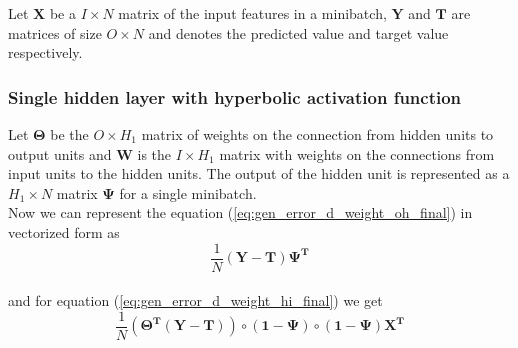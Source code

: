 Let $\mathbf{X}$ be a $I \times N$ matrix of the input features in a minibatch, $\mathbf{Y}$ and $\mathbf{T}$ are matrices of size $O \times N$ and denotes the predicted value and target value respectively. 

\subsubsection{Single hidden layer with hyperbolic activation function} \label{ch:mtx_single_hidden_layer}
 Let $\mathbf{\Theta}$ be the $O \times H_{1}$ matrix of weights on the connection from hidden units to output units and $\mathbf{W}$ is the $I \times H_{1}$ matrix with weights on the connections from input units to the hidden units. The output of the hidden unit is represented as a $H_{1} \times N$ matrix $\mathbf{\Psi}$ for a single minibatch.  
 \\
 Now we can represent the equation (\ref{eq:gen_error_d_weight_oh_final}) in vectorized form as
\begin{displaymath}
 \frac{1}{N}(\mathbf{Y}-\mathbf{T}) \mathbf{\Psi^{T}} 
 \end{displaymath}
 \\
 and for equation (\ref{eq:gen_error_d_weight_hi_final}) we get
 \begin{displaymath}
 \frac{1}{N}(\mathbf{\Theta^{T}}(\mathbf{Y}-\mathbf{T})) \circ (\mathbf{1} - \mathbf{\Psi}) \circ (\mathbf{1} - \mathbf{\Psi}) \mathbf{X^{T}}
 \end{displaymath}

